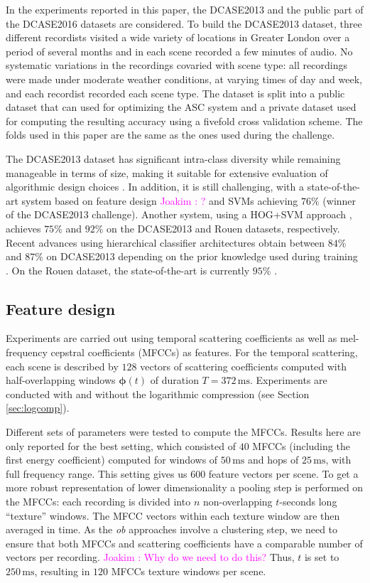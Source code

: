 \documentclass[journal]{IEEEtran}
\newcommand{\ja}[1]{\textcolor{magenta}{Joakim : #1}}
\begin{document}
In the experiments reported in this paper, the DCASE2013 \cite{giannoulis2013database, 7100934} and the public part of the DCASE2016 datasets  \cite{Mesaros2016_EUSIPCO} are considered. To build the DCASE2013 dataset, three different recordists visited a wide variety of locations in Greater London over
a period of several months and in each
scene recorded a few minutes of audio. No
systematic variations in the recordings covaried with scene
type: all recordings were made under moderate weather conditions, at varying times of day and week, and each recordist recorded each scene type.
The dataset is split into a public dataset that can used for optimizing the ASC system and a private dataset used for computing the resulting accuracy using a fivefold cross validation scheme. The folds used in this paper are the same as the ones used during the challenge. 

The DCASE2013 dataset has significant intra-class diversity while remaining manageable in terms of size, making it suitable for extensive evaluation of algorithmic design choices \cite{lagrange:hal-01082501}. In addition, it is still challenging, with a state-of-the-art system based on feature design \ja{?} and SVMs achieving $76\%$ \cite{roma2013} (winner of the DCASE2013 challenge). Another system, using a HOG+SVM approach \cite{rakotomamonjy2015histogram}, achieves $75\%$ and $92\%$ on the DCASE2013 and Rouen datasets, respectively. Recent advances using hierarchical classifier architectures obtain between $84\%$ and $87\%$ on DCASE2013 depending on the prior knowledge used during training \cite{phan2016label}. On the Rouen dataset, the state-of-the-art is currently $95\%$ \cite{bisot2016acoustic}.


\subsection{Feature design}

Experiments are carried out using temporal scattering coefficients as well as mel-frequency cepstral coefficients (MFCCs) as features. For the temporal scattering, each scene is described by $128$ vectors of scattering coefficients computed with half-overlapping windows $\boldsymbol{\phi}(t)$ of duration $T=372\,\mathrm{ms}$. Experiments are conducted with and without the logarithmic compression (see Section \ref{sec:logcomp}).

Different sets of parameters were tested to compute the MFCCs. Results here are only reported for the best setting, which consisted of $40$ MFCCs (including the first energy coefficient) computed for windows of $50\,\mathrm{ms}$ and hops of $25\,\mathrm{ms}$, with full frequency range. This setting gives us $600$ feature vectors per scene. To get a more robust representation of lower dimensionality a pooling step is performed on the MFCCs: each recording is divided into $n$ non-overlapping $t$-seconds long ``texture'' windows. The MFCC vectors within each texture window are then averaged in time. As the \emph{ob} approaches involve a clustering step, we need to ensure that both MFCCs and scattering coefficients have a comparable number of vectors per recording. \ja{Why do we need to do this?} Thus, $t$ is set to $250\,\mathrm{ms}$, resulting in $120$ MFCCs texture windows per scene.
\end{document}
